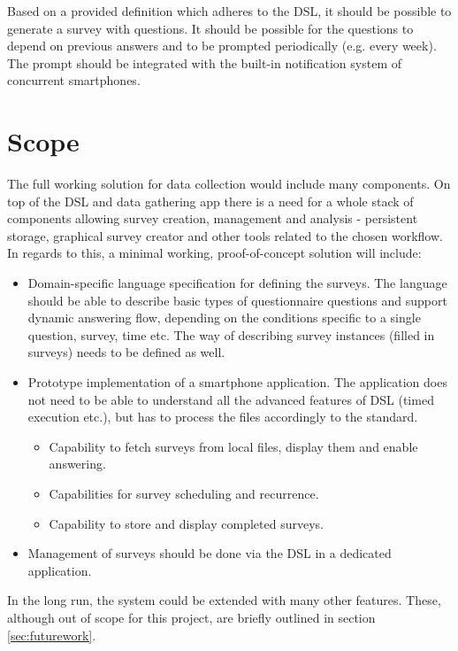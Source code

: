 Based on a provided definition which adheres to the DSL, it should be possible to generate a survey with questions. It should be possible for the questions to depend on previous answers and to be prompted periodically (e.g. every week). The prompt should be integrated with the built-in notification system of concurrent smartphones.

\section{Scope}
\label{sec:Scope}
The full working solution for data collection would include many components. On top of the DSL and data gathering app there is a need for a whole stack of components allowing survey creation, management and analysis - persistent storage, graphical survey creator and other tools related to the chosen workflow. In regards to this, a minimal working, proof-of-concept solution will include:

\begin{itemize}
\item Domain-specific language specification for defining the surveys. The language should be able to describe basic types of questionnaire questions and support dynamic answering flow, depending on the conditions specific to a single question, survey, time etc. The way of describing survey instances (filled in surveys) needs to be defined as well.
\item Prototype implementation of a smartphone application. The application does not need to be able to understand all the advanced features of DSL (timed execution etc.), but has to process the files accordingly to the standard.
	\begin{itemize}
		\item Capability to fetch surveys from local files, display them and enable answering.
		\item Capabilities for survey scheduling and recurrence.
		\item Capability to store and display completed surveys.
	\end{itemize}
\item Management of surveys should be done via the DSL in a dedicated application. %
\end{itemize}

In the long run, the system could be extended with many other features. These, although out of scope for this project, are briefly outlined in section \ref{sec:futurework}.

